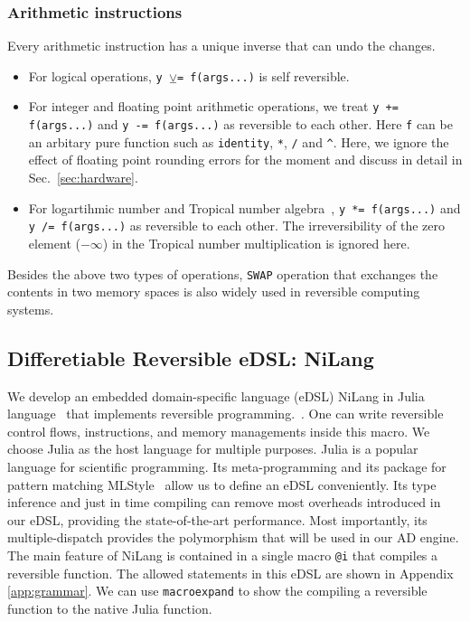 \documentclass{article}
\newcommand{\<}{\langle}
\renewcommand{\>}{\rangle}
\newcommand{\Sec}[1]{Sec.~\ref{#1}}
\newcommand{\App}[1]{Appendix \ref{#1}}
\theoremstyle{definition}\newtheorem{definition}{\textit{Definition}}
\begin{document}
\subsubsection{Arithmetic instructions}
Every arithmetic instruction has a unique inverse that can undo the changes.
\begin{itemize}
    \item For logical operations, \texttt{y $\veebar$= f(args...)} is self reversible.
    \item For integer and floating point arithmetic operations, we treat \texttt{y += f(args...)} and \texttt{y -= f(args...)} as reversible to each other. Here \texttt{f} can be an arbitary pure function such as \texttt{identity}, \texttt{*}, \texttt{/} and \texttt{\^}. Here, we ignore the effect of floating point rounding errors for the moment and discuss in detail in \Sec{sec:hardware}.
    \item For logartihmic number and Tropical number algebra~\cite{Speyer2009}, \texttt{y *= f(args...)} and \texttt{y /= f(args...)} as reversible to each other. The irreversibility of the zero element ($-\infty$) in the Tropical number multiplication is ignored here.
\end{itemize}
Besides the above two types of operations, \texttt{SWAP} operation that exchanges the contents in two memory spaces is also widely used in reversible computing systems.

\subsection{Differetiable Reversible eDSL: NiLang}
    We develop an embedded domain-specific language (eDSL) NiLang in Julia language~\cite{Bezanson2012,Bezanson2017} that implements reversible programming.~\cite{Perumalla2013,Frank2017}. One can write reversible control flows, instructions, and memory managements inside this macro.
We choose Julia as the host language for multiple purposes. Julia is a popular language for scientific programming. Its meta-programming and its package for pattern matching MLStyle~\cite{MLStyle} allow us to define an eDSL conveniently. Its type inference and just in time compiling can remove most overheads introduced in our eDSL, providing the state-of-the-art performance. Most importantly, its multiple-dispatch provides the polymorphism that will be used in our AD engine.
The main feature of NiLang is contained in a single macro \texttt{@i} that compiles a reversible function.
The allowed statements in this eDSL are shown in \App{app:grammar}.
We can use \texttt{macroexpand} to show the compiling a reversible function to the native Julia function.
\end{document}
